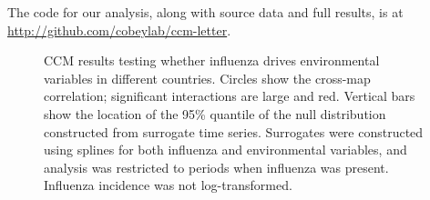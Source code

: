 \documentclass[11pt]{article}
\begin{document}
The code for our analysis, along with source data and full results, is at \\ \url{http://github.com/cobeylab/ccm-letter}.

\begin{figure}
\centering
\caption{
    \label{fig:bycountry}
    CCM results testing whether influenza drives environmental variables in different countries.
    Circles show the cross-map correlation; significant interactions are large and red.
    Vertical bars show the location of the 95\% quantile of the null distribution constructed from surrogate time series.
    Surrogates were constructed using splines for both influenza and environmental variables, and analysis was restricted to periods when influenza was present.
    Influenza incidence was not log-transformed.
}
\end{figure}

\begin{table}
\centering
\caption{
    \label{tab:summary}
    Summary of CCM results for whether influenza drives environmental variables, and vice versa, in different countries.
    Tests used surrogates for influenza and/or environmental variables,
    and either untransformed or log-transformed influenza incidence.
    Results are shown with and without the requirement that the maximum cross-correlation occur in the correct temporal direction.
    Surrogates were constructed using splines, and analysis was restricted to periods when influenza was present.
    Numbers are out of a total of 104 tests (26 countries, 4 tests each).
}
\end{table}
\end{document}
